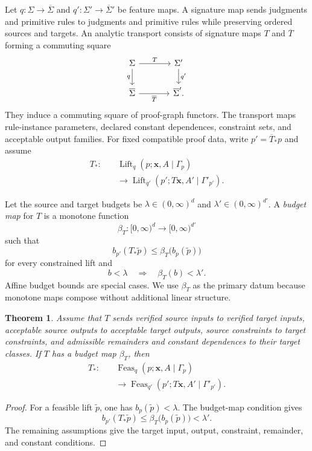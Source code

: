 \documentclass[10pt,journal,a4paper]{IEEEtran}
\newtheorem{theorem}{Theorem}[section]
\theoremstyle{definition}
\begin{document}
Let $q:\Sigma\to\overline\Sigma$ and $q':\Sigma'\to\overline\Sigma'$ be feature maps. A signature map sends judgments and primitive rules to judgments and primitive rules while preserving ordered sources and targets. An analytic transport consists of signature maps $T$ and $\overline T$ forming a commuting square
\[
\begin{tikzcd}[column sep=large]
  \Sigma \arrow[r,"T"] \arrow[d,"q"']
    & \Sigma' \arrow[d,"q'"] \\
  \overline\Sigma \arrow[r,"\overline T"']
    & \overline\Sigma' .
\end{tikzcd}
\]
They induce a commuting square of proof-graph functors. The transport maps rule-instance parameters, declared constant dependences, constraint sets, and acceptable output families. For fixed compatible proof data, write $p'=\overline T_*p$ and assume
\[
\begin{aligned}
  T_*:\quad&
  \operatorname{Lift}_q(p;\mathbf x,A\mid\Gamma_p)\\
  &\longrightarrow
  \operatorname{Lift}_{q'}
  (p';T\mathbf x,A'\mid\Gamma'_{p'}).
\end{aligned}
\]

Let the source and target budgets be $\lambda\in(0,\infty)^d$ and $\lambda'\in(0,\infty)^{d'}$. A \emph{budget map} for $T$ is a monotone function
\[
  \beta_T:[0,\infty)^d\longrightarrow[0,\infty)^{d'}
\]
such that
\[
  b_{p'}(T_*\widetilde p)
  \leq
  \beta_T\bigl(b_p(\widetilde p)\bigr)
\]
for every constrained lift and
\[
  b<\lambda
  \quad\Longrightarrow\quad
  \beta_T(b)<\lambda'.
\]
Affine budget bounds are special cases. We use $\beta_T$ as the primary datum because monotone maps compose without additional linear structure.

\begin{theorem}
Assume that $T$ sends verified source inputs to verified target inputs, acceptable source outputs to acceptable target outputs, source constraints to target constraints, and admissible remainders and constant dependences to their target classes. If $T$ has a budget map $\beta_T$, then
\[
\begin{aligned}
  T_*:\quad&
  \operatorname{Feas}_q(p;\mathbf x,A\mid\Gamma_p)\\
  &\longrightarrow
  \operatorname{Feas}_{q'}(p';T\mathbf x,A'\mid\Gamma'_{p'}).
\end{aligned}
\]
\end{theorem}

\begin{proof}
For a feasible lift $\widetilde p$, one has $b_p(\widetilde p)<\lambda$. The budget-map condition gives
\[
  b_{p'}(T_*\widetilde p)
  \leq
  \beta_T\bigl(b_p(\widetilde p)\bigr)
  <\lambda'.
\]
The remaining assumptions give the target input, output, constraint, remainder, and constant conditions.
\end{proof}
\end{document}

